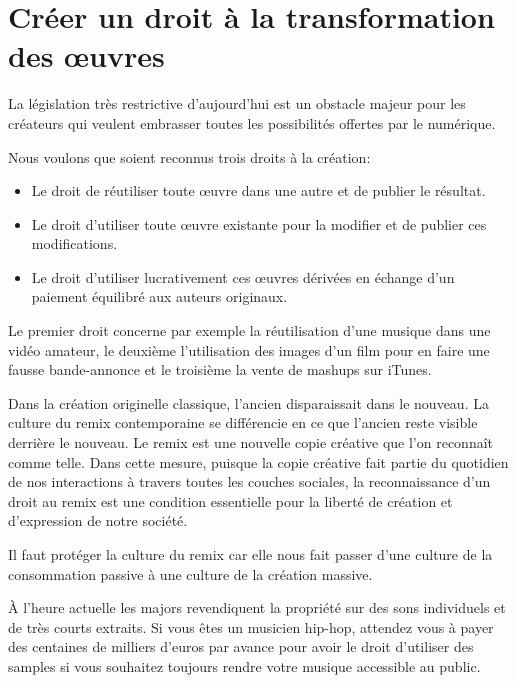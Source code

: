 \chapter{Créer un droit à la transformation des œuvres}\label{remix}

La législation très restrictive d’aujourd’hui est un obstacle majeur pour les créateurs qui veulent embrasser toutes les possibilités offertes par le numérique.

\begin{mesure}
Nous voulons que soient reconnus trois droits à la création:

\begin{itemize}
\item Le droit de réutiliser toute œuvre dans une autre et de publier le résultat. 
\item Le droit d’utiliser toute œuvre existante pour la modifier et de publier ces modifications. 
\item Le droit d’utiliser lucrativement ces œuvres dérivées en échange d’un paiement équilibré aux auteurs originaux. 
\end{itemize}
\end{mesure}

Le premier droit concerne par exemple la réutilisation d'une musique dans une vidéo amateur, le deuxième l'utilisation des images d'un film pour en faire une fausse bande-annonce et le troisième la vente de mashups sur iTunes.

Dans la création originelle classique, l’ancien disparaissait dans le nouveau. La culture du remix contemporaine se différencie en ce que l’ancien reste visible derrière le nouveau. Le remix est une nouvelle copie créative que l’on reconnaît comme telle. Dans cette mesure, puisque la copie créative fait partie du quotidien de nos interactions à travers toutes les couches sociales, la reconnaissance d’un droit au remix est une condition essentielle pour la liberté de création et d'expression de notre société.

Il faut protéger la culture du remix car elle nous fait passer d’une culture de la consommation passive à une culture de la création massive.

À l'heure actuelle les majors revendiquent
la propriété sur des sons individuels et de très courts extraits. Si vous êtes un musicien hip-hop,
attendez vous à payer des centaines de milliers d’euros par avance pour avoir le droit d’utiliser
des samples si vous souhaitez toujours rendre votre musique accessible au public.


